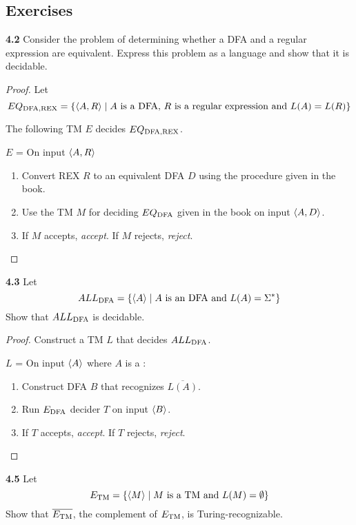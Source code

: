 \subsection{Exercises}
\label{lang:EQDFAREX_DCDB}
\textbf{4.2} Consider the problem of determining whether a DFA and a regular expression are equivalent. Express this problem as a language and show that it is decidable.
\begin{mdframed}
\begin{proof}
Let 
\[
EQ_{\text{DFA},\text{REX}} = \{\langle{A, R}\rangle \mid \text{$A$ is a DFA, $R$ is a regular expression and $L(A) = L(R)$} \} 
\]

The following TM $E$ decides $EQ_{\text{DFA},\text{REX}}$.

\medskip
$E$ = On input $\langle{A, R}\rangle$
\begin{enumerate}
\item Convert REX $R$ to an equivalent DFA $D$ using the procedure given in the book.
\item Use the TM $M$ for deciding $EQ_{\text{DFA}}$ given in the book on input $\langle{A, D}\rangle$.
\item If $M$ accepts, \textit{accept}. If $M$ rejects, \textit{reject}.
\end{enumerate}
\end{proof}
\end{mdframed}

\label{lang:ALLDFA_DCDB}
\textbf{4.3} Let
\[
ALL_{\text{DFA}} = \{ \langle{A}\rangle \mid \text{$A$ is an DFA and $L(A) = \Sigma^*$}\}
\]
Show that $ALL_{\text{DFA}}$ is decidable. 
\begin{mdframed}
\begin{proof}
Construct a TM $L$ that decides $ALL_{\text{DFA}}$.

\medskip
$L$ = On input $\langle{A}\rangle$ where $A$ is a \DFA:
\begin{enumerate}
\item Construct DFA $B$ that recognizes $\overline{L(A)}$.
\item Run $E_{\text{DFA}}$ decider $T$ on input $\langle{B}\rangle$.
\item If $T$ accepts, \textit{accept}. If $T$ rejects, \textit{reject}.
\end{enumerate}
\end{proof}
\end{mdframed}

\label{lang:ETMC_TR}
\textbf{4.5} Let
\[
E_{\text{TM}} = \{\langle{M}\rangle \mid \text{$M$ is a TM and $L(M) = \emptyset$}\}
\]
Show that $\overline{E_{\text{TM}}}$, the complement of $E_{\text{TM}}$, is Turing-recognizable.

